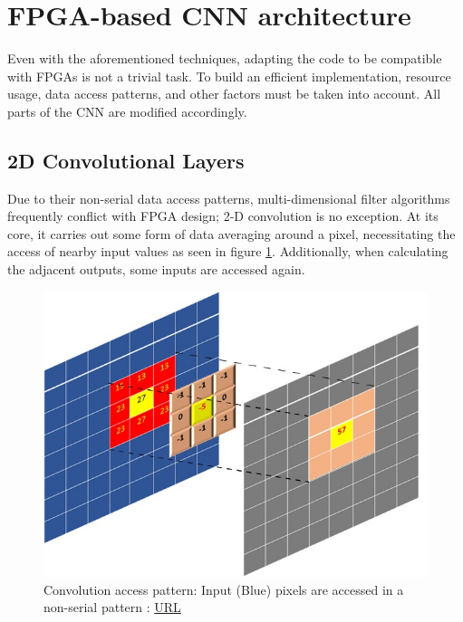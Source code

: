 \section{FPGA-based CNN architecture}
\label{sec:FPGA_architecture}
Even with the aforementioned techniques, adapting the code to be compatible with FPGAs is not a trivial task. To build an efficient implementation, resource usage, data access patterns, and other factors must be taken into account. All parts of the CNN are modified accordingly.

\subsection{2D Convolutional Layers}
Due to their non-serial data access patterns, multi-dimensional filter algorithms frequently conflict with FPGA design; 2-D convolution is no exception. At its core, it carries out some form of data averaging around a pixel, necessitating the access of nearby input values as seen in figure \ref{fig: convolution access pattern}. Additionally, when calculating the adjacent outputs, some inputs are accessed again.

\begin{figure}[H]
    \centering
        \includegraphics[width=1\textwidth]{Images/diagrams/convolution_access_pattern.jpg}
        \decoRule
        \caption[convolution access pattern]{Convolution access pattern: Input (Blue) pixels are accessed in a non-serial pattern \cite{vitis_tutorials}: \href{https://github.com/Xilinx/Vitis-Tutorials/blob/2022.1/Hardware_Acceleration/Design_Tutorials/01-convolution-tutorial/lab1_app_introduction_performance_estimation.md}{URL} }
        \label{fig: convolution access pattern}
\end{figure}

